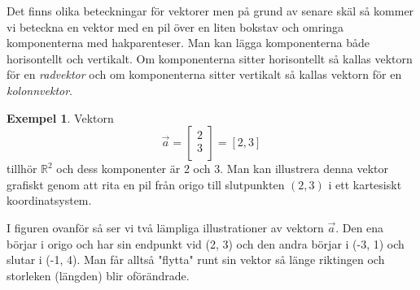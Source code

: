 \documentclass{article}
\theoremstyle{definition}
\newtheorem{exmp}[thm]{Exempel}
\begin{document}
Det finns olika beteckningar för vektorer men på grund av senare skäl
så kommer vi beteckna en vektor med en pil över en liten bokstav och omringa komponenterna 
med hakparenteser. Man kan lägga komponenterna både horisontellt och vertikalt. Om komponenterna
sitter horisontellt så kallas vektorn för en \textit{radvektor} och om komponenterna sitter 
vertikalt så kallas vektorn för en \textit{kolonnvektor}.
\begin{exmp}
  Vektorn
\[\vec{a} = 
\begin{bmatrix}
  2 \\
  3 \\
\end{bmatrix} = [2, 3]
\]
tillhör $\mathbb{R}^2$ och dess komponenter är 2 och 3. 
Man kan illustrera denna vektor grafiskt 
genom att rita en pil från origo till slutpunkten $(2, 3)$ i ett kartesiskt koordinatsystem.
\begin{center}
\end{center}
I figuren ovanför så ser vi två lämpliga illustrationer av vektorn $\vec{a}$. Den ena börjar i origo
och har sin endpunkt vid (2, 3) och den andra börjar i (-3, 1) och slutar i (-1, 4). Man får alltså 
"flytta" runt sin vektor så länge riktingen och storleken (längden) blir oförändrade. 
\end{exmp}
\end{document}
